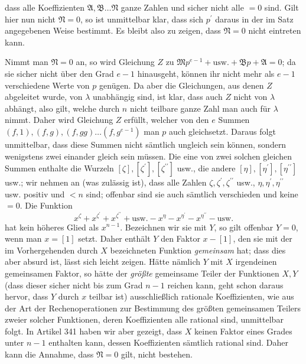 dass alle Koeffizienten \(\mathfrak A,\allowbreak \mathfrak B\ldots\mathfrak N\) ganze Zahlen und sicher nicht alle \(=0\) sind. Gilt hier nun nicht \(\mathfrak N=0\), so ist unmittelbar klar, dass sich \(p^{\prime}\) daraus in der im
Satz angegebenen Weise bestimmt. Es bleibt also zu zeigen, dass \(\mathfrak N=0\) nicht eintreten kann.

Nimmt man \(\mathfrak N=0\) an, so wird Gleichung \(Z\) zu \(\mathfrak Mp^{e-1}+\text{usw.}+\mathfrak Bp+\mathfrak A=0\); da sie sicher nicht über den Grad \(e-1\) hinausgeht, können ihr nicht mehr als \(e-1\) verschiedene Werte von \(p\) genügen. Da aber die Gleichungen, aus denen \(Z\) abgeleitet wurde, von \(\lambda\) unabhängig sind, ist klar, dass auch \(Z\) nicht von \(\lambda\) abhängt, also gilt, welche durch \(n\) nicht teilbare ganze Zahl man auch für \(\lambda\) nimmt. Daher wird Gleichung \(Z\) erfüllt, welcher von den \(e\) Summen \((f,\allowbreak 1),\allowbreak (f,\allowbreak g),\allowbreak (f,\allowbreak gg)\ldots(f,\allowbreak g^{e-1})\) man \(p\) auch gleichsetzt. Daraus folgt unmittelbar, dass diese Summen nicht sämtlich ungleich sein können, sondern wenigstens zwei einander gleich sein müssen. Die eine von zwei solchen gleichen Summen enthalte die Wurzeln \([\zeta],\allowbreak [\zeta^{\prime}],\allowbreak [\zeta^{\prime\prime}]\) usw., die andere \([\eta],\allowbreak [\eta^{\prime}],\allowbreak [\eta^{\prime\prime}]\) usw.; wir nehmen an (was zulässig ist), dass alle Zahlen \(\zeta,\allowbreak \zeta^{\prime},\allowbreak \zeta^{\prime\prime}\) usw., \(\eta,\allowbreak \eta^{\prime},\allowbreak \eta^{\prime\prime}\) usw. positiv und \(<n\) sind; offenbar sind sie auch sämtlich verschieden und keine \(=0\). Die Funktion \[x^\zeta+x^{\zeta^{\prime}}+x^{\zeta^{\prime\prime}}+\text{usw.}-x^\eta-x^{\eta^{\prime}}-x^{\eta^{\prime\prime}}-\text{usw.}\] hat kein höheres Glied als \(x^{n-1}\). Bezeichnen wir sie mit \(Y\), so gilt offenbar \(Y=0\), wenn man \(x=[1]\) setzt. Daher enthält \(Y\) den Faktor \(x-[1]\), den sie mit der im Vorhergehenden durch \(X\) bezeichneten Funktion \textit{gemeinsam} hat; dass dies aber absurd ist, lässt sich leicht zeigen. Hätte nämlich \(Y\) mit \(X\) irgendeinen gemeinsamen Faktor, so hätte der \textit{größte} gemeinsame Teiler der Funktionen \(X,\allowbreak Y\) (dass dieser sicher nicht bis zum Grad \(n-1\) reichen kann, geht schon daraus hervor, dass \(Y\) durch \(x\) teilbar ist) ausschließlich rationale Koeffizienten, wie aus der Art der Rechenoperationen zur Bestimmung des größten gemeinsamen Teilers zweier solcher Funktionen, deren Koeffizienten alle rational sind, unmittelbar folgt. In Artikel 341 haben wir aber gezeigt, dass \(X\) keinen Faktor eines Grades unter \(n-1\) enthalten kann, dessen Koeffizienten sämtlich rational sind. Daher kann die Annahme, dass \(\mathfrak N=0\) gilt, nicht bestehen.

